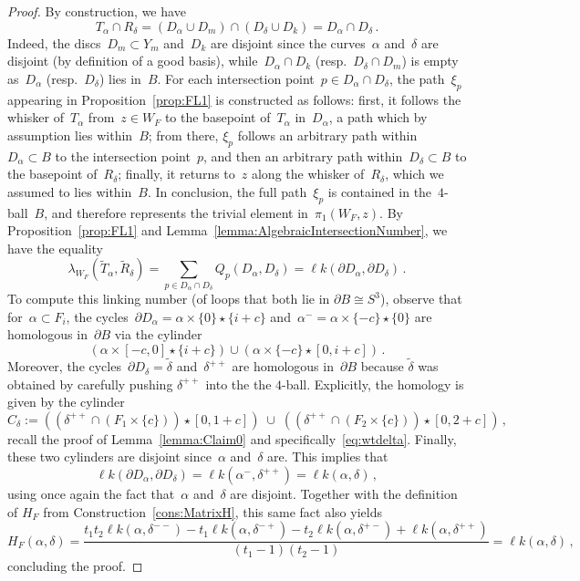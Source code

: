 \documentclass[10.9pt,a4paper]{amsart}
\theoremstyle{definition}
\theoremstyle{remark}
\newcommand{\lk}{\ell k}
\begin{document}
\begin{proof}
By construction, we have 
\[
T_{\alpha} \cap R_{\delta} = (D_{\alpha} \cup D_m ) \cap (D_{\delta} \cup D_{k})=D_{\alpha} \cap D_{\delta}\,.
\]
Indeed, the discs~$D_m \subset Y_m$ and~$D_k$ are disjoint since the curves~$\alpha$ and~$\delta$ are disjoint (by definition of a good basis), while~$D_{\alpha} \cap D_k$ (resp.~$D_{\delta}\cap D_m$) is empty as~$D_{\alpha}$ (resp.~$D_{\delta}$) lies in~$B$.
For each intersection point~$p \in D_{\alpha} \cap D_{\delta}$, the path~$\xi_p$ appearing in Proposition~\ref{prop:FL1} is constructed as follows: first, it follows the whisker of~$T_{\alpha}$ from~$z\in W_F$ to the basepoint of~$T_{\alpha}$ in~$D_{\alpha}$, a path which by assumption lies within~$B$; from there, $\xi_p$ follows an arbitrary path within~$D_{\alpha}\subset B$ to the intersection point~$p$, and then an arbitrary path within~$D_{\delta}\subset B$ to the basepoint of~$R_{\delta}$; finally, it returns to~$z$ along the whisker of~$R_{\delta}$, which we assumed to lies within~$B$. In conclusion, the full path~$\xi_p$ is contained in the~$4$-ball~$B$, and therefore represents the trivial element in~$\pi_1(W_F,z)$.
By Proposition~\ref{prop:FL1} and Lemma~\ref{lemma:AlgebraicIntersectionNumber}, we have the equality
\[
\lambda_{W_F}(\tilde T_{\alpha},\tilde R_{\delta}) = \sum_{p \in D_{\alpha} \cap D_{\delta}} Q_p(D_{\alpha},D_{\delta}) = \lk(\partial D_{\alpha}, \partial D_{\delta})\,.
\]
To compute this linking number (of loops that both lie in $\partial B \cong S^3$), observe that for~$\alpha\subset F_i$, the cycles~$\partial D_{\alpha}=\alpha\times\{0\}\star\{i+c\}$ and~$\alpha^{-}=\alpha\times\{-c\}\star \{0\}$ are homologous in~$\partial B$ via the cylinder 
\[
(\alpha \times [-c,0] \star \{i+c\}) \cup (\alpha \times \{-c\} \star [0,i+c])\,.
\]
Moreover, the cycles~$\partial D_{\delta}=\tilde \delta$ and~$\delta^{++}$ are homologous in~$\partial B$ because $\tilde \delta$  was obtained by carefully pushing $\delta^{++}$ into the the $4$-ball.
Explicitly, the homology is given by the cylinder
\begin{equation}
\label{eq:cylinder}
C_{\delta}:=((\delta^{++} \cap (F_1 \times \{c\})) \star [0,1+c]) \;\cup\; ((\delta^{++} \cap (F_2 \times \{c\})) \star [0, 2+c])\,,
\end{equation}
recall the proof of Lemma~\ref{lemma:Claim0} and specifically~\eqref{eq:wtdelta}.
Finally, these two cylinders are disjoint since~$\alpha$ and~$\delta$ are. 
This implies that
\[
\lk(\partial D_{\alpha}, \partial D_{\delta}) = \lk(\alpha^{-}, \delta^{++})=\lk(\alpha,\delta)\,,
\]
using once again the fact that~$\alpha$ and~$\delta$ are disjoint. 
Together with the definition of $H_F$ from Construction~\ref{cons:MatrixH},
this same fact also yields
\[
H_F(\alpha, \delta) = \frac{t_1t_2 \lk(\alpha, \delta^{--}) - t_1 \lk(\alpha, \delta^{-+}) - t_2 \lk(\alpha, \delta^{+-}) + \lk(\alpha, \delta^{++})}{(t_1-1)(t_2-1)} = \lk(\alpha, \delta)\,,
\]
concluding the proof.
\end{proof}
\end{document}
